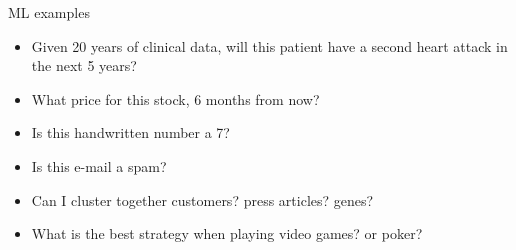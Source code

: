 \documentclass{beamer}
\begin{document}
\begin{frame}{ML examples}
\begin{overlayarea}{\textwidth}{5cm}
\begin{itemize}
\item<1-> Given 20 years of clinical data, will this patient have a second heart attack in the next 5 years?
\item<2-> What price for this stock, 6 months from now?
\item<3-> Is this handwritten number a 7?
\item<4-> Is this e-mail a spam?
\item<5-> Can I cluster together customers? press articles? genes?
\item<6-> What is the best strategy when playing video games? or poker?
\end{itemize}
\end{overlayarea}
\begin{overlayarea}{\textwidth}{2.5cm}
\begin{center}

\end{center}
\end{overlayarea}
\end{frame}
\end{document}
